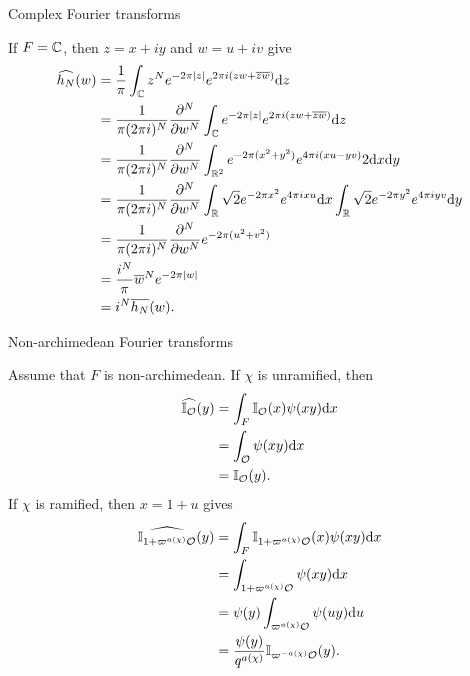 \begin{frame}{Complex Fourier transforms}

If $ F = \mathbb{C} $, then $ z = x + iy $ and $ w = u + iv $ give
\begin{align*}
\widehat{h_N}(w)
& = \dfrac{1}{\pi}\int_{\mathbb{C}} z^Ne^{-2\pi|z|}e^{2\pi i(zw + \overline{z}\overline{w})}\mathrm{d} z \\
& = \dfrac{1}{\pi(2\pi i)^N}\dfrac{\partial^N}{\partial w^N}\int_{\mathbb{C}} e^{-2\pi|z|}e^{2\pi i(zw + \overline{z}\overline{w})}\mathrm{d} z \\
& = \dfrac{1}{\pi(2\pi i)^N}\dfrac{\partial^N}{\partial w^N}\int_{\mathbb{R}^2} e^{-2\pi(x^2 + y^2)}e^{4\pi i(xu - yv)}2\mathrm{d} x\mathrm{d} y \\
& = \dfrac{1}{\pi(2\pi i)^N}\dfrac{\partial^N}{\partial w^N}\int_{\mathbb{R}} \sqrt{2}e^{-2\pi x^2}e^{4\pi i xu}\mathrm{d} x\int_{\mathbb{R}} \sqrt{2}e^{-2\pi y^2}e^{4\pi i yv}\mathrm{d} y \\
& = \dfrac{1}{\pi(2\pi i)^N}\dfrac{\partial^N}{\partial w^N}e^{-2\pi(u^2 + v^2)} \\
& = \dfrac{i^N}{\pi}\overline{w}^Ne^{-2\pi|w|} \\
& = i^N\overline{h_N}(w).
\end{align*}

\end{frame}

\begin{frame}{Non-archimedean Fourier transforms}

Assume that $ F $ is non-archimedean. If $ \chi $ is unramified, then
\begin{align*}
\widehat{\mathbb{I}_{\mathcal{O}}}(y)
& = \int_F \mathbb{I}_{\mathcal{O}}(x)\psi(xy)\mathrm{d} x \\
& = \int_{\mathcal{O}} \psi(xy)\mathrm{d} x \\
& = \mathbb{I}_{\mathcal{O}}(y).
\end{align*}
If $ \chi $ is ramified, then $ x = 1 + u $ gives
\begin{align*}
\widehat{\mathbb{I}_{1 + \varpi^{a(\chi)}\mathcal{O}}}(y)
& = \int_F \mathbb{I}_{1 + \varpi^{a(\chi)}\mathcal{O}}(x)\psi(xy)\mathrm{d} x \\
& = \int_{1 + \varpi^{a(\chi)}\mathcal{O}} \psi(xy)\mathrm{d} x \\
& = \psi(y)\int_{\varpi^{a(\chi)}\mathcal{O}} \psi(uy)\mathrm{d} u \\
& = \dfrac{\psi(y)}{q^{a(\chi)}}\mathbb{I}_{\varpi^{-a(\chi)}\mathcal{O}}(y).
\end{align*}

\end{frame}

